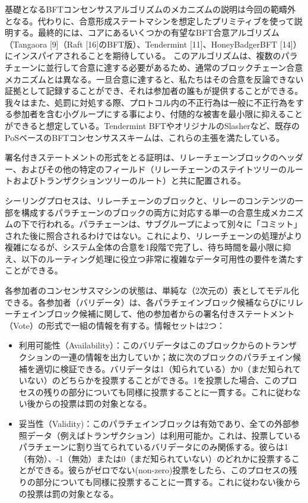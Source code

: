 基礎となるBFTコンセンサスアルゴリズムのメカニズムの説明は今回の範疇外となる。代わりに、合意形成ステートマシンを想定したプリミティブを使って説明する。最終的には、コアにあるいくつかの有望なBFT合意アルゴリズム（Tangaora
{[}9{]}（Raft {[}16{]}のBFT版）、Tendermint {[}11{]}、HoneyBadgerBFT
{[}14{]}）にインスパイアされることを期待している。
このアルゴリズムは、複数のパラチェーンに並行して合意に達する必要があるため、通常のブロックチェーン合意メカニズムとは異なる。一旦合意に達すると、私たちはその合意を反論できない証拠として記録することができ、それは参加者の誰もが提供することができる。我々はまた、処罰に対処する際、プロトコル内の不正行為は一般に不正行為をする参加者を含む小グループにする事により、付随的な被害を最小限に抑えることができると想定している。Tendermint
BFTやオリジナルのSlasherなど、既存のPoSベースのBFTコンセンサススキームは、これらの主張を満たしている。

署名付きステートメントの形式をとる証明は、リレーチェーンブロックのヘッダー、およびその他の特定のフィールド（リレーチェーンのステイトツリーのルートおよびトランザクションツリーのルート）と共に配置される。

シーリングプロセスは、リレーチェーンのブロックと、リレーのコンテンツの一部を構成するパラチェーンのブロックの両方に対応する単一の合意生成メカニズムの下で行われる。パラチェーンは、サブグループによって別々に「コミット」された後に照合されるわけではない。これにより、リレーチェーンの処理がより複雑になるが、システム全体の合意を1段階で完了し、待ち時間を最小限に抑え、以下のルーティング処理に役立つ非常に複雑なデータ可用性の要件を満たすことができる。

各参加者のコンセンサスマシンの状態は、単純な（2次元の）表としてモデル化できる。各参加者（バリデータ）は、各パラチェインブロック候補ならびにリレーチェインブロック候補に関して、他の参加者からの署名付きステートメント（Vote）の形式で一組の情報を有する。情報セットは2つ：

\begin{itemize}
\item
  利用可能性（Availability）：このバリデータはこのブロックからのトランザクションの一連の情報を出力していか；故に次のブロックのパラチェイン候補を適切に検証できる。バリデータは1（知られている）か0（まだ知られていない）のどちらかを投票することができる。1を投票した場合、このプロセスの残りの部分についても同様に投票することに一貫する。これに従わない後からの投票は罰の対象となる。
\item
  妥当性（Validity)：このパラチェインブロックは有効であり、全ての外部参照データ（例えばトランザクション）は利用可能か。これは、投票しているパラチェーンに割り当てられているバリデータにのみ関係する。彼らは1（有効）、-1（無効）または0（まだ知られていない）のどれかに投票することができる。彼らがゼロでない(non-zero)投票をしたら、このプロセスの残りの部分についても同様に投票することに一貫する。これに従わない後からの投票は罰の対象となる。
\end{itemize}

